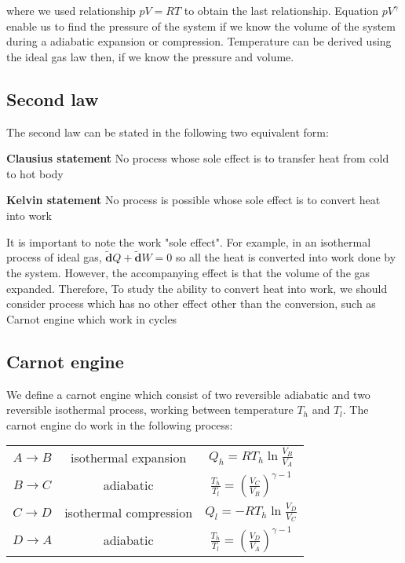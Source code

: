 \documentclass{article}
\newcommand{\dbar}{\mathbf{\tilde{d}}}
\begin{document}
where we used relationship $pV = RT$ to obtain the last relationship. Equation $p V^{\gamma}$ 
enable us to find the pressure of the system if we know the volume of the 
system during a adiabatic expansion or compression. Temperature can be derived using the ideal 
gas law then, if we know the pressure and volume.

\subsection{Second law}
The second law can be stated in the following two equivalent form:

\textbf{Clausius statement} No process whose sole effect is to transfer heat from cold to hot body

\textbf{Kelvin statement} No process is possible whose sole effect is to convert heat into work

It is important to note the work "sole effect". For example, in an isothermal process of ideal gas, 
$\dbar Q + \dbar W = 0$ so all the heat is converted into work done by the system. However, the 
accompanying effect is that the volume of the gas expanded. 
Therefore, To study the ability to convert heat into work, we should consider process which has no 
other effect other than the conversion, such as Carnot engine which work in cycles

\subsection{Carnot engine}
We define a carnot engine which consist of two reversible adiabatic and two reversible 
isothermal process, working between temperature $T_h$ and $T_l$. The carnot engine do work
in the following process:

\begin{table*}[h]
    \centering
    \begin{tabular}{ccc}
        $ A \to B $ & isothermal expansion & $Q_h = RT_h \ln \frac{V_B}{V_A}$ \\
        $ B \to C $ & adiabatic & $ \frac{T_h}{T_l} = \left( \frac{V_C}{V_B} \right) ^ {\gamma-1} $ \\
        $ C \to D $ & isothermal compression & $Q_l = - RT_h \ln \frac{V_D}{V_C}$ \\
        $ D \to A $ & adiabatic & $ \frac{T_h}{T_l} = \left( \frac{V_D}{V_A} \right) ^ {\gamma-1}$ \\
    \end{tabular}
\end{table*}
\end{document}
